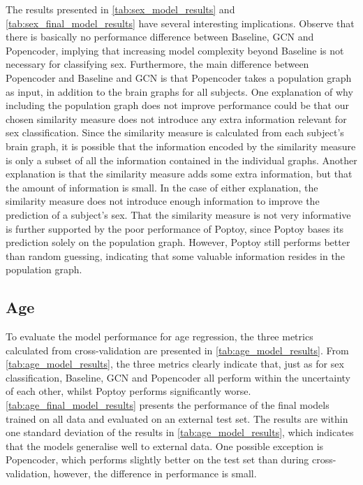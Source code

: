 The results presented in \cref{tab:sex_model_results} and \cref{tab:sex_final_model_results} have several interesting implications. Observe that there is basically no performance difference between Baseline, GCN and Popencoder, implying that increasing model complexity beyond Baseline is not necessary for classifying sex. Furthermore, the main difference between Popencoder and Baseline and GCN is that Popencoder takes a population graph as input, in addition to the brain graphs for all subjects. One explanation of why including the population graph does not improve performance could be that our chosen similarity measure does not introduce any extra information relevant for sex classification. Since the similarity measure is calculated from each subject's brain graph, it is possible that the information encoded by the similarity measure is only a subset of all the information contained in the individual graphs. Another explanation is that the similarity measure adds some extra information, but that the amount of information is small. In the case of either explanation, the similarity measure does not introduce enough information to improve the prediction of a subject's sex. That the similarity measure is not very informative is further supported by the poor performance of Poptoy, since Poptoy bases its prediction solely on the population graph. However, Poptoy still performs better than random guessing, indicating that some valuable information resides in the population graph. 

\subsection{Age}
To evaluate the model performance for age regression, the three metrics calculated from cross-validation are presented in \cref{tab:age_model_results}. From \cref{tab:age_model_results}, the three metrics clearly indicate that, just as for sex classification, Baseline, GCN and Popencoder all perform within the uncertainty of each other, whilst Poptoy performs significantly worse.  \cref{tab:age_final_model_results} presents the performance of the final models trained on all data and evaluated on an external test set. The results are within one standard deviation of the results in \cref{tab:age_model_results}, which indicates that the models generalise well to external data. One possible exception is Popencoder, which performs slightly better on the test set than during cross-validation, however, the difference in performance is small.

